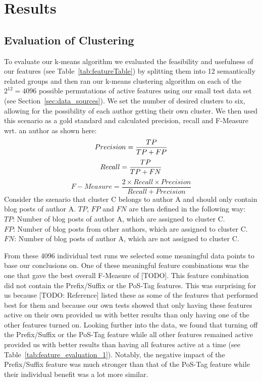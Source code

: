 \section{Results}
\label{sec:results}


\subsection{Evaluation of Clustering}
\label{sec:evaluation_clustering}
To evaluate our k-means algorithm we evaluated the feasibility and usefulness of our features (see Table~\ref{tab:featureTable}) by splitting them into 12 semantically related groups and then ran our k-means clustering algorithm on each of the $2^{12} = 4096$ possible permutations of active features using our small test data set (see Section~\ref{sec:data_sources}).
We set the number of desired clusters to six, allowing for the possibility of each author getting their own cluster.
We then used this scenario as a gold standard and calculated precision, recall and F-Measure wrt. an author as shown here:
\begin{equation}
	Precision = \frac{TP}{TP + FP} \\
	\label{eq:precision}
\end{equation}
\begin{equation}
	Recall = \frac{TP}{TP + FN} \\
	\label{eq:recall}
\end{equation}
\begin{equation}
	F-Measure = \frac{2 \times Recall \times Precision}{Recall + Precision}
	\label{eq:fMeasure}
\end{equation}
Consider the szenario that cluster C belongs to author A and should only contain blog posts of author A.
$TP$, $FP$ and $FN$ are then defined in the following way: \\
$TP$: Number of blog posts of author A, which are assigned to cluster C. \\
$FP$: Number of blog posts from other authors, which are assigned to cluster C. \\
$FN$: Number of blog posts of author A, which are not assigned to cluster C.


From these 4096 individual test runs we selected some meaningful data points to base our conclusions on.
One of these meaningful feature combinations was the one that gave the best overall F-Measure of [TODO].
This feature combination did not contain the Prefix/Suffix or the PoS-Tag features.
This was surprising for us because [TODO: Reference] listed these as some of the features that performed best for them and because our own tests showed that only having these features active on their own provided us with better results than only having one of the other features turned on.
Looking further into the data, we found that turning off the Prefix/Suffix or the PoS-Tag feature while all other features remained active provided us with better results than having all features active at a time (see Table~\ref{tab:feature_evaluation_1}).
Notably, the negative impact of the Prefix/Suffix feature was much stronger than that of the PoS-Tag feature while their individual benefit was a lot more similar.

